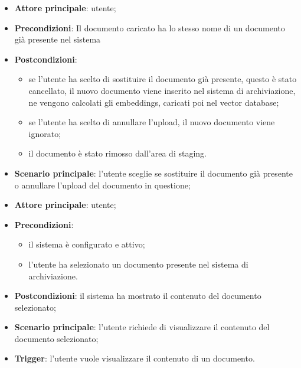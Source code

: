 \documentclass[10pt, a4paper]{article}
\begin{document}
    \begin{itemize}
        \item \textbf{Attore principale}: utente;
        \item \textbf{Precondizioni}: Il documento caricato ha lo stesso nome di un documento già presente nel sistema
        \item \textbf{Postcondizioni}:
        \begin{itemize}
            \item se l'utente ha scelto di sostituire il documento già presente, questo è stato cancellato, il nuovo documento viene inserito nel sistema di archiviazione, ne vengono calcolati gli embeddings, caricati poi nel vector database;
            \item se l'utente ha scelto di annullare l'upload, il nuovo documento viene ignorato;
            \item il documento è stato rimosso dall’area di staging.
        \end{itemize}
        \item \textbf{Scenario principale}: l’utente sceglie se sostituire il documento già presente o annullare l'upload del documento in questione;
    \end{itemize}

    \begin{itemize}
        \item \textbf{Attore principale}: utente;
        \item \textbf{Precondizioni}:
        \begin{itemize}
            \item il sistema è configurato e attivo;
            \item l’utente ha selezionato un documento presente nel sistema di archiviazione.
        \end{itemize}
        \item \textbf{Postcondizioni}: il sistema ha mostrato il contenuto del documento selezionato;
        \item \textbf{Scenario principale}: l’utente richiede di visualizzare il contenuto del documento selezionato;
        \item \textbf{Trigger}: l’utente vuole visualizzare il contenuto di un documento.
    \end{itemize}
\end{document}
